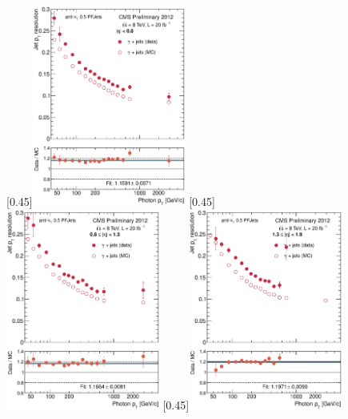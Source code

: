 \begin{figure}[p]
    \centering
    \subcaptionbox{\label{fig:reso_bal_eta008}}[0.45\textwidth]{\includegraphics[width=0.45\textwidth]{chapitre4/figs/reso_balancing/resolution_eta008_balancing.eps}}\hfill
    \subcaptionbox{\label{fig:reso_bal_eta0813}}[0.45\textwidth]{\includegraphics[width=0.45\textwidth]{chapitre4/figs/reso_balancing/resolution_eta0813_balancing.eps}}
    \subcaptionbox{\label{fig:reso_bal_eta1319}}[0.45\textwidth]{\includegraphics[width=0.45\textwidth]{chapitre4/figs/reso_balancing/resolution_eta1319_balancing.eps}}\hfill

\end{figure}
